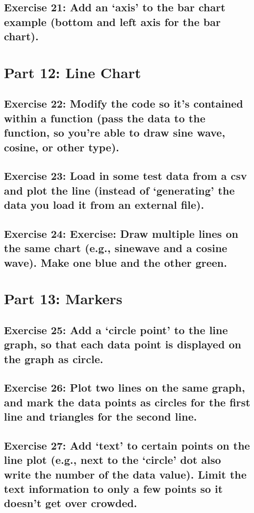 \documentclass[11pt]{article}   	%
\begin{document}
\subsection{Exercise 21: Add an ‘axis’ to the bar chart example (bottom and left axis for the bar chart).}

\section{Part 12: Line Chart }
\subsection{ Exercise 22: Modify the code so it’s contained within a function (pass the data to the function, so you’re able to draw sine wave, cosine, or other type).}
\subsection{Exercise 23: Load in some test data from a csv and plot the line (instead of ‘generating’ the data you load it from an external file).}
\subsection{ Exercise 24: Exercise: Draw multiple lines on the same chart (e.g., sinewave and a cosine wave). Make one blue and the other green.}

\section{Part 13: Markers}
\subsection{Exercise 25: Add a ‘circle point’ to the line graph, so that each data point is displayed on the graph as circle.}
\subsection{ Exercise 26: Plot two lines on the same graph, and mark the data points as circles for the first line and triangles for the second line.}
\subsection{Exercise 27: Add ‘text’ to certain points on the line plot (e.g., next to the ‘circle’ dot also write the number of the data value). Limit the text information to only a few points so it doesn’t get over crowded.}
\end{document}
